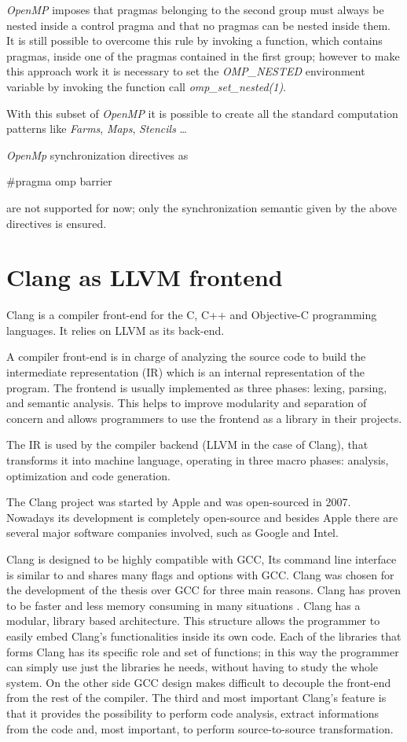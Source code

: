 \documentclass[a4paper,11pt,oneside]{book}
\begin{document}
 \emph{OpenMP} imposes that pragmas belonging to the second group must always be nested inside a control pragma and that no pragmas can be nested inside them. It is still possible to overcome this rule by invoking a function, which contains pragmas, inside one of the pragmas contained in the first group; however to make this approach work it is necessary to set the \emph{OMP\_NESTED} environment variable by invoking the function call \emph{omp\_set\_nested(1)}.

With this subset of \emph{OpenMP} it is possible to create all the standard computation patterns like \emph{Farms}, \emph{Maps}, \emph{Stencils} \dots 

\emph{OpenMp} synchronization directives as \begin{bf}$\#$pragma omp barrier\end{bf} are not supported for now; only the synchronization semantic given by the above directives is ensured. 

\section{Clang as LLVM frontend}

Clang \cite{clang} is a compiler front-end for the C, C++ and Objective-C programming languages. It relies on LLVM as its back-end. 

A compiler front-end is in charge of analyzing the source code to build the intermediate representation (IR) which is an internal representation of the program. The front\-end is usually implemented as three phases: lexing, parsing, and semantic analysis. This helps to improve modularity and separation of concern and allows programmers to use the front\-end as a library in their projects. 

The IR is used by the compiler back\-end (LLVM in the case of Clang), that transforms it into machine language, operating in three macro phases: analysis, optimization and code generation. 

The Clang project was started by Apple and was open-sourced in 2007. Nowadays its development is completely open-source and besides Apple there are several major software companies involved, such as Google and Intel.

Clang is designed to be highly compatible with GCC, Its command line interface is similar to and shares many flags and options with GCC. Clang was chosen for the development of the thesis over GCC for three main reasons. Clang has proven to be faster and less memory consuming in many situations \cite{clanggcc}. Clang has a modular, library based architecture. This structure allows the programmer to easily embed Clang’s functionalities inside its own code. Each of the libraries that forms Clang has its specific role and set of functions; in this way the programmer can simply use just the libraries he needs, without having to study the whole system. On the other side GCC design makes difficult to decouple the front-end from the rest of the compiler.
The third and most important Clang’s feature is that it provides the possibility to perform code analysis, extract informations from the code and, most important, to perform source-to-source transformation.
\end{document}
